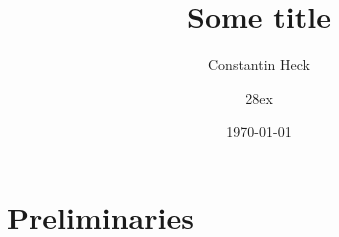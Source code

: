 \documentclass[paper=a4, fontsize=12pt,parskip=half,draft,headings=small]{scrartcl}
\title{Some title}
\author{Constantin Heck}
\date{\today}
\begin{document}

	
	\section{Preliminaries}
	
	
	



		
	
	

	\begin{flushright}
		\signature{28ex}
	\end{flushright}
	
	
\end{document}
